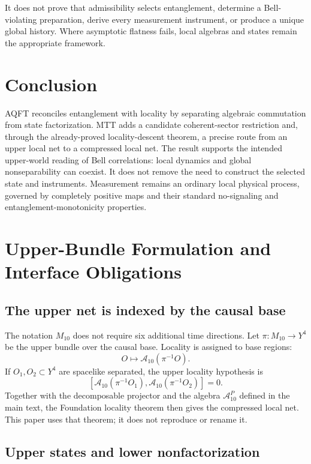\documentclass[11pt]{article}
\begin{document}
It does not prove that admissibility selects entanglement, determine a
Bell-violating preparation, derive every measurement instrument, or produce a
unique global history.  Where asymptotic flatness fails, local algebras and
states remain the appropriate framework.

\section{Conclusion}

AQFT reconciles entanglement with locality by separating algebraic
commutation from state factorization.  MTT adds a candidate coherent-sector
restriction and, through the already-proved locality-descent theorem, a
precise route from an upper local net to a compressed local net.  The result
supports the intended upper-world reading of Bell correlations: local
dynamics and global nonseparability can coexist.  It does not remove the need
to construct the selected state and instruments.  Measurement remains an
ordinary local physical process, governed by completely positive maps and
their standard no-signaling and entanglement-monotonicity properties.

\appendix
\section{Upper-Bundle Formulation and Interface Obligations}
\label{app:10D-FP}

\subsection{The upper net is indexed by the causal base}

The notation $M_{10}$ does not require six additional time directions.
Let $\pi:M_{10}\to Y^4$ be the upper bundle over the causal base.  Locality is
assigned to base regions:
\[
 O\longmapsto\mathcal A_{10}(\pi^{-1}O).
\]
If $O_1,O_2\subset Y^4$ are spacelike separated, the upper locality
hypothesis is
\[
 [\mathcal A_{10}(\pi^{-1}O_1),
   \mathcal A_{10}(\pi^{-1}O_2)]=0.
\]
Together with the decomposable projector and the algebra
$\mathcal A_{10}^P$ defined in the main text, the Foundation locality theorem
then gives the compressed local net.  This paper uses that theorem; it does
not reproduce or rename it.

\subsection{Upper states and lower nonfactorization}
\end{document}
